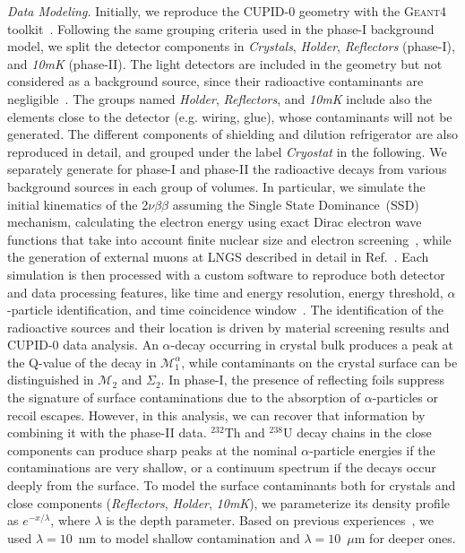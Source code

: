 \documentclass[%
reprint,
superscriptaddress,
altaffilletter,
showpacs,
showkeys,
amsmath, amssymb, aps,prl, floatfix,
]{revtex4-1}
\newcommand{\THO}{$^{232}\mathrm{Th}$\xspace}
\newcommand{\UR}{$^{238}\mathrm{U}$\xspace}
\newcommand{\vv}{2$\nu\beta\beta$\xspace}
\newcommand{\mspeconea}{$\mathcal{M}^{\alpha}_{1}$\xspace}
\newcommand{\mspectwo}{$\mathcal{M}_2$\xspace}
\newcommand{\summspectwo}{$\Sigma_2$\xspace}
\newcommand{\phone}{phase-I\xspace}
\newcommand{\phtwo}{phase-II\xspace}
\begin{document}
{\it Data Modeling.} Initially, we reproduce the CUPID-0 geometry with the \textsc{Geant4} toolkit~\cite{Geant4}. 
Following the same grouping criteria used in the \phone background model, we split the detector components in \textit{Crystals}, \textit{Holder}, \textit{Reflectors} (\phone), and \textit{10mK} (\phtwo).
The light detectors are included in the geometry but not considered as a background source, since their radioactive contaminants are negligible~\cite{Azzolini:2019nmi}.
The groups named \textit{Holder}, \textit{Reflectors}, and \textit{10mK} include also the elements close to the detector (e.g. wiring, glue), whose contaminants will not be generated.
The different components of shielding and dilution refrigerator are also reproduced in detail, and grouped under the label \textit{Cryostat} in the following.
We separately generate for \phone and \phtwo the radioactive decays from various background sources in each group of volumes.
In particular, we simulate the initial kinematics of the \vv assuming the Single State Dominance~(SSD) mechanism, calculating the electron energy using exact Dirac electron wave functions that take into account finite nuclear size and electron screening~\cite{Kotila:2012zza}, while the generation of external muons at LNGS described in detail in Ref.~\cite{CUORICINO:2009zeh}.
Each simulation is then processed with a custom software to reproduce both detector and data processing features, like time and energy resolution, energy threshold, $\alpha$-particle identification, and time coincidence window~\cite{Azzolini:2018yye}.
The identification of the radioactive sources and their location is driven by material screening results and CUPID-0 data analysis. An $\alpha$-decay occurring in crystal bulk produces a peak at the Q-value of the decay in \mspeconea, while contaminants on the crystal surface can be distinguished in \mspectwo and \summspectwo. In \phone, the presence of reflecting foils 
suppress the signature of surface contaminations due to the absorption of $\alpha$-particles or recoil escapes. However, in this analysis, we can recover that information by combining it with the \phtwo data. \THO and \UR decay chains in the close components can produce sharp peaks at the nominal $\alpha$-particle energies if the contaminations are very shallow, or a continuum spectrum if the decays occur deeply from the surface.
To model the surface contaminants both for crystals and close components (\textit{Reflectors}, \textit{Holder}, \textit{10mK}), we parameterize its density profile as $e^{-x/\lambda}$, where $\lambda$ is the depth parameter. Based on previous experiences~\cite{Azzolini:2019nmi}, we used $\lambda = 10$~nm to model shallow contamination and $\lambda = 10$~$\mu$m for deeper ones.
\end{document}
